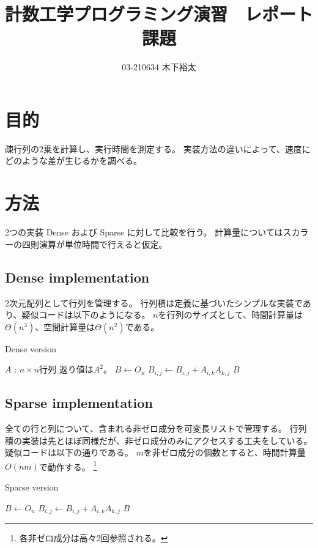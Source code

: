 \documentclass[uplatex, dvipdfmx]{jsarticle}
\title{
  計数工学プログラミング演習　レポート課題
}
\author{
    03-210634 木下裕太
}
\theoremstyle{case}
\begin{document}
  \maketitle

  \section{目的}
  疎行列の2乗を計算し、実行時間を測定する。
  実装方法の違いによって、速度にどのような差が生じるかを調べる。

  \section{方法}
  2つの実装 Dense および Sparse に対して比較を行う。
  計算量についてはスカラーの四則演算が単位時間で行えると仮定。

  \subsection{Dense implementation}
  2次元配列として行列を管理する。
  行列積は定義に基づいたシンプルな実装であり、疑似コードは以下のようになる。
  $n$を行列のサイズとして、時間計算量は$\Theta(n^3)$、空間計算量は$\Theta(n^2)$である。

  \begin{algorithm}[h]
    \centering
    \caption{Dense version}
    \begin{algorithmic}[1]
      \Require
      \Statex $A$ : $n\times n$行列
      \Ensure
      \Statex 返り値は$A^2$。
      \State $B\gets O_n$
      \State $B_{i,j} \gets B_{i,j} + A_{i,k}A_{k,j}$
      \EndFor
      \EndFor
      \EndFor
      \State \Return $B$
      \EndFunction
    \end{algorithmic}
  \end{algorithm}

  \subsection{Sparse implementation}
  全ての行と列について、含まれる非ゼロ成分を可変長リストで管理する。
  行列積の実装は先とほぼ同様だが、非ゼロ成分のみにアクセスする工夫をしている。
  疑似コードは以下の通りである。
  $m$を非ゼロ成分の個数とすると、時間計算量$O(nm)$で動作する。
  \footnote{各非ゼロ成分は高々2回参照される。}

  \begin{algorithm}[h]
    \centering
    \caption{Sparse version}
    \begin{algorithmic}[1]
      \State $B\gets O_n$
      \State $B_{i,j} \gets B_{i,j} + A_{i,k}A_{k,j}$
      \EndFor
      \EndFor
      \EndFor
      \State \Return $B$
      \EndFunction
    \end{algorithmic}
  \end{algorithm}
\end{document}
